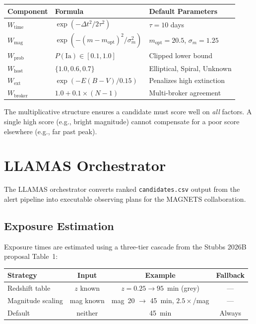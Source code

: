 \documentclass[11pt,letterpaper]{article}
\begin{document}
\begin{center}
\begin{tabular}{lll}
\toprule
Component & Formula & Default Parameters \\
\midrule
$W_{\mathrm{time}}$ & $\exp(-\Delta t^2 / 2\tau^2)$ &
  $\tau = 10$ days \\
$W_{\mathrm{mag}}$ & $\exp(-(m - m_{\mathrm{opt}})^2 / \sigma_m^2)$ &
  $m_{\mathrm{opt}} = 20.5$, $\sigma_m = 1.25$ \\
$W_{\mathrm{prob}}$ & $P(\mathrm{Ia}) \in [0.1, 1.0]$ &
  Clipped lower bound \\
$W_{\mathrm{host}}$ & $\{1.0, 0.6, 0.7\}$ &
  Elliptical, Spiral, Unknown \\
$W_{\mathrm{ext}}$ & $\exp(-E(B\!-\!V) / 0.15)$ &
  Penalizes high extinction \\
$W_{\mathrm{broker}}$ & $1.0 + 0.1 \times (N - 1)$ &
  Multi-broker agreement \\
\bottomrule
\end{tabular}
\end{center}

The multiplicative structure ensures a candidate must score well on
\emph{all} factors.  A single high score (e.g., bright magnitude) cannot
compensate for a poor score elsewhere (e.g., far past peak).


\section{LLAMAS Orchestrator}
\label{sec:orchestrator}

The LLAMAS orchestrator converts ranked \texttt{candidates.csv} output
from the alert pipeline into executable observing plans for the MAGNETS
collaboration.

\subsection{Exposure Estimation}

Exposure times are estimated using a three-tier cascade from the Stubbs
2026B proposal Table~1:

\begin{center}
\begin{tabular}{lccc}
\toprule
Strategy & Input & Example & Fallback \\
\midrule
Redshift table & $z$ known & $z = 0.25 \to 95$~min (grey) & --- \\
Magnitude scaling & mag known & mag~20 $\to$ 45~min, $2.5\times$/mag & --- \\
Default & neither & 45~min & Always \\
\bottomrule
\end{tabular}
\end{center}
\end{document}
